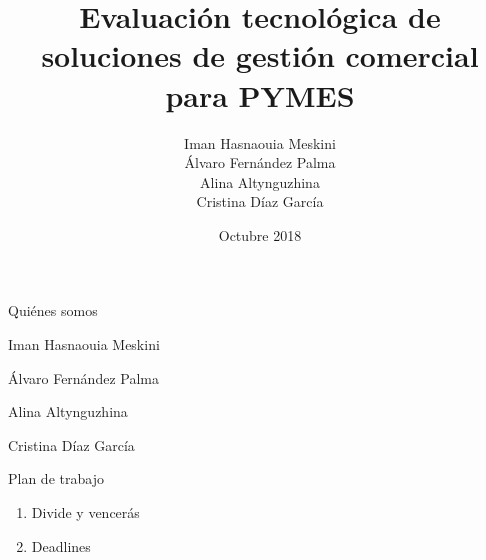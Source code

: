 \documentclass{beamer}
\title{Evaluación tecnológica de \\soluciones de gestión comercial para PYMES}
\author{Iman Hasnaouia Meskini\\ Álvaro Fernández Palma\\ Alina Altynguzhina \\ Cristina Díaz García}
\institute{Introducción a los Sistemas de Información}
\date{Octubre 2018}
\begin{document}

\begin{frame}
	\maketitle %
\end{frame}




\begin{frame}{Quiénes somos}

	Iman Hasnaouia Meskini
	
	Álvaro Fernández Palma
	
	Alina Altynguzhina
	
	Cristina Díaz García
	
\end{frame}




\begin{frame}{Plan de trabajo}

\begin{enumerate}
	\item Divide y vencerás
	\item Deadlines
\end{enumerate}
	
\end{frame}


\end{document}
